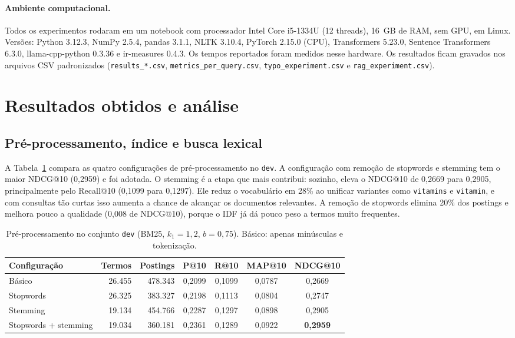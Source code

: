 \documentclass[11pt,a4paper]{article}
\newcommand{\cod}[1]{\texttt{#1}}
\begin{document}
\paragraph{Ambiente computacional.} Todos os experimentos rodaram em um notebook com processador Intel Core i5-1334U (12 threads), 16~GB de RAM, sem GPU, em Linux. Versões: Python 3.12.3, NumPy 2.5.4, pandas 3.1.1, NLTK 3.10.4, PyTorch 2.15.0 (CPU), Transformers 5.23.0, Sentence Transformers 6.3.0, llama-cpp-python 0.3.36 e ir-measures 0.4.3. Os tempos reportados foram medidos nesse hardware. Os resultados ficam gravados nos arquivos CSV padronizados (\cod{results\_*.csv}, \cod{metrics\_per\_query.csv}, \cod{typo\_experiment.csv} e \cod{rag\_experiment.csv}).

\section{Resultados obtidos e análise}
\label{sec:resultados}

\subsection{Pré-processamento, índice e busca lexical}
\label{sec:res-lexical}

A Tabela~\ref{tab:preproc} compara as quatro configurações de pré-processamento no \cod{dev}. A configuração com remoção de stopwords e stemming tem o maior NDCG@10 (0,2959) e foi adotada. O stemming é a etapa que mais contribui: sozinho, eleva o NDCG@10 de 0,2669 para 0,2905, principalmente pelo Recall@10 (0,1099 para 0,1297). Ele reduz o vocabulário em 28\% ao unificar variantes como \cod{vitamins} e \cod{vitamin}, e com consultas tão curtas isso aumenta a chance de alcançar os documentos relevantes. A remoção de stopwords elimina 20\% dos postings e melhora pouco a qualidade (0,008 de NDCG@10), porque o IDF já dá pouco peso a termos muito frequentes.

\begin{table}[!htb]
\centering\small
\caption{Pré-processamento no conjunto \cod{dev} (BM25, $k_1=1{,}2$, $b=0{,}75$). Básico: apenas minúsculas e tokenização.}
\label{tab:preproc}
\begin{tabular}{lrrcccc}
\toprule
Configuração & Termos & Postings & P@10 & R@10 & MAP@10 & NDCG@10 \\
\midrule
Básico & 26.455 & 478.343 & 0,2099 & 0,1099 & 0,0787 & 0,2669 \\
Stopwords & 26.325 & 383.327 & 0,2198 & 0,1113 & 0,0804 & 0,2747 \\
Stemming & 19.134 & 454.766 & 0,2287 & 0,1297 & 0,0898 & 0,2905 \\
Stopwords + stemming & 19.034 & 360.181 & 0,2361 & 0,1289 & 0,0922 & \textbf{0,2959} \\
\bottomrule
\end{tabular}
\end{table}
\end{document}
